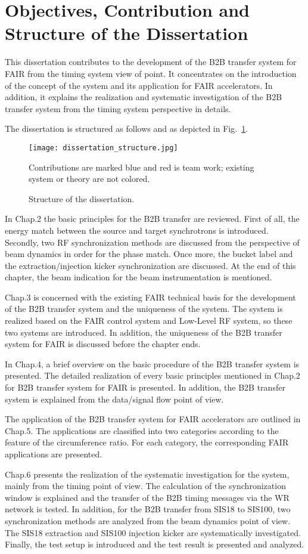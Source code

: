 \section{Objectives, Contribution and Structure of the Dissertation}
This dissertation contributes to the development of the B2B transfer system for FAIR from the timing system view of point. It concentrates on the introduction of the concept of the system and its application for FAIR accelerators. In addition, it explains the realization and systematic investigation of the B2B transfer system from the timing system perspective in details.

The dissertation is structured as follows and as depicted in Fig.~\ref{dissertation_structure}.
\begin{figure}[H]
   \centering   
   \texttt{[image: dissertation\_structure.jpg]}
   \caption{Structure of the dissertation.}{Contributions are marked blue and red is team work; existing system or theory are not colored.}
   \label{dissertation_structure}
\end{figure}

In Chap.2 the basic principles for the B2B transfer are reviewed. First of all, the energy match between the source and target synchrotrons is introduced. Secondly, two RF synchronization methods are discussed from the perspective of beam dynamics in order for the phase match. Once more, the bucket label and the extraction/injection kicker synchronization are discussed. At the end of this chapter, the beam indication for the beam instrumentation is mentioned.

Chap.3 is concerned with the existing FAIR technical basis for the development of the B2B transfer system and the uniqueness of the system. The system is realized based on the FAIR control system and Low-Level RF system, so these two systems are introduced. In addition, the uniqueness of the B2B transfer system for FAIR is discussed before the chapter ends. 

In Chap.4, a brief overview on the basic procedure of the B2B transfer system is presented. The detailed realization of every basic principles mentioned in Chap.2 for B2B transfer system for FAIR is presented. In addition, the B2B transfer system is explained from the data/signal flow point of view.

The application of the B2B transfer system for FAIR accelerators are outlined in Chap.5. The applications are classified into two categories according to the feature of the circumference ratio. For each category, the corresponding FAIR applications are presented. 

Chap.6 presents the realization of the systematic investigation for the system, mainly from the timing point of view. The calculation of the synchronization window is explained and the transfer of the B2B timing messages via the WR network is tested. In addition, for the B2B transfer from SIS18 to SIS100, two synchronization methods are analyzed from the beam dynamics point of view. The SIS18 extraction and SIS100 injection kicker are systematically investigated. Finally, the test setup is introduced and the test result is presented and analyzed.

%
%
